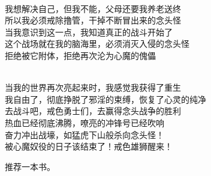 \begin{poem}[恶念附体]
\begin{multicols}{2}
\begin{center}
            ~\\

            我想解决自己，但我不能，父母还要我养老送终 \\ 所以我必须戒除撸管，干掉不断冒出来的念头怪 \\ 当我意识到这一点，我知道真正的战斗开始了 \\ 这个战场就在我的脑海里，必须消灭入侵的念头怪 \\ 拒绝被它附体，拒绝再次沦为心魔的傀儡

            ~\\

            当我的世界再次亮起来时，我感觉我获得了重生 \\ 我自由了，彻底挣脱了邪淫的束缚，恢复了心灵的纯净 \\ 去战斗吧，戒色勇士们，去赢得念头战争的胜利 \\ 热血已经彻底沸腾，嘹亮的冲锋号已经吹响 \\ 奋力冲出战壕，如猛虎下山般杀向念头怪！ \\ 被心魔奴役的日子该结束了！戒色雄狮醒来！
        \end{center}
    \end{multicols}
\end{poem}

推荐一本书。

